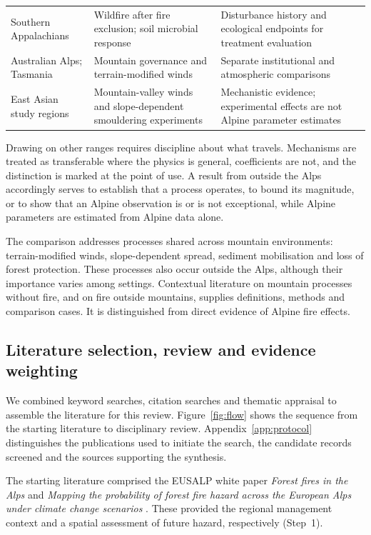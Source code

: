 \documentclass[11pt,a4paper]{article}
\begin{document}
\begin{table}[H]
\begin{tabularx}{\textwidth}{@{}>{\raggedright\arraybackslash}p{2.1cm} >{\raggedright\arraybackslash}p{3.0cm} >{\raggedright\arraybackslash}X >{\raggedright\arraybackslash}p{2.9cm}@{}}
Southern Appalachians & Wildfire after fire exclusion; soil microbial response & Disturbance history and ecological endpoints for treatment evaluation & \citep{reilly_drivers_2022, snyder_taxonomic_2026} \\
Australian Alps; Tasmania & Mountain governance and terrain-modified winds & Separate institutional and atmospheric comparisons & \citep{lockwood_biodiversity_2014, ozaki_impact_2022} \\
East Asian study regions & Mountain-valley winds and slope-dependent smouldering experiments & Mechanistic evidence; experimental effects are not Alpine parameter estimates & \citep{wang_dynamic_2026, shan_influence_2024} \\
\bottomrule
\end{tabularx}
\end{table}

Drawing on other ranges requires discipline about what travels. Mechanisms are treated as transferable where the physics is general, coefficients are not, and the distinction is marked at the point of use. A result from outside the Alps accordingly serves to establish that a process operates, to bound its magnitude, or to show that an Alpine observation is or is not exceptional, while Alpine parameters are estimated from Alpine data alone.

The comparison addresses processes shared across mountain environments: terrain-modified winds, slope-dependent spread, sediment mobilisation and loss of forest protection. These processes also occur outside the Alps, although their importance varies among settings. Contextual literature on mountain processes without fire, and on fire outside mountains, supplies definitions, methods and comparison cases. It is distinguished from direct evidence of Alpine fire effects.

\subsection{Literature selection, review and evidence weighting}

We combined keyword searches, citation searches and thematic appraisal to assemble the literature for this review. Figure~\ref{fig:flow} shows the sequence from the starting literature to disciplinary review. Appendix~\ref{app:protocol} distinguishes the publications used to initiate the search, the candidate records screened and the sources supporting the synthesis.

The starting literature comprised the EUSALP white paper \emph{Forest fires in the Alps} \citep{muller_forest_2020} and \emph{Mapping the probability of forest fire hazard across the European Alps under climate change scenarios} \citep{gerberding_mapping_2025}. These provided the regional management context and a spatial assessment of future hazard, respectively (Step~1).
\end{document}
